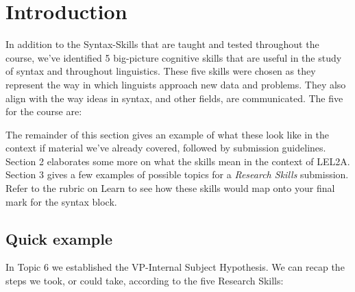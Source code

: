 \documentclass{article}
\begin{document}
\maketitle
\subtitle{Research Skills Assignment}

\section{Introduction}
In addition to the Syntax-Skills that are taught and tested throughout the course, we've identified 5 big-picture cognitive skills that are useful in the study of syntax and throughout linguistics.
These five skills were chosen as they represent the way in which linguists approach new data and problems.
They also align with the way ideas in syntax, and other fields, are communicated.
The five  for the course are:
\begin{exe}
    \label{hypothesise_1}
    \label{supporthypothesis_1}
    \label{definehypothesis_1}
    \label{refutehypothesis_1}
    \label{diagnosticlimits_1}
\end{exe}

The remainder of this section gives an example of what these look like in the context if material we've already covered, followed by submission guidelines. Section 2 elaborates some more on what the skills mean in the context of LEL2A. Section 3 gives a few examples of possible topics for a \emph{Research Skills} submission.  Refer to the rubric on Learn to see how these skills would map onto your final mark for the syntax block.

    \subsection{Quick example}
In Topic 6 we established the VP-Internal Subject Hypothesis. We can recap the steps we took, or could take, according to the five Research Skills:
\end{document}
